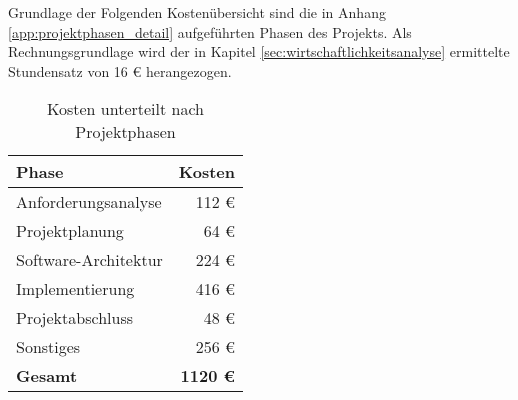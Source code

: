 \label{app:kosten}

Grundlage der Folgenden Kostenübersicht sind die in Anhang \ref{app:projektphasen_detail} aufgeführten Phasen des Projekts.
Als Rechnungsgrundlage wird der in Kapitel \ref{sec:wirtschaftlichkeitsanalyse} ermittelte Stundensatz von 16 \euro{} herangezogen.

\begin{table}[H]
	\centering
	\begin{tabular}{lr}

		\rowcolor{white!15}
		\textbf{Phase} & \textbf{Kosten}  \\\hline


		Anforderungsanalyse		& 112 \euro \\
		Projektplanung			& 64 \euro \\
		Software-Architektur	& 224 \euro \\
		Implementierung			& 416 \euro \\
		Projektabschluss		& 48 \euro \\
		Sonstiges				& 256 \euro \\\hline
		\textbf{Gesamt}			& \textbf{1120 \euro}


	\end{tabular}

	\caption{Kosten unterteilt nach Projektphasen}
	\label{tab:kosten_detail}
\end{table}
